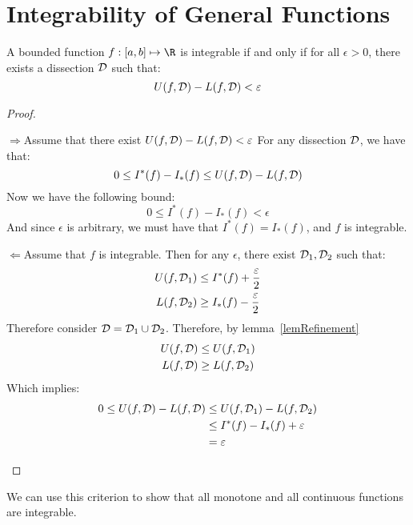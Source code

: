 \documentclass[../Main.tex]{subfiles}
\begin{document}
\section{Integrability of General Functions}
\begin{theorem}
    A bounded function $f : [a, b] \mapsto \R$ is integrable if and only if for all $\epsilon > 0$, there exists a dissection $\mathcal{D}$ such that:
    \begin{equation*}
        U(f, \mathcal{D}) - L(f, \mathcal{D}) < \varepsilon
    \end{equation*}
    \label{thmRiemannCriterion}
\end{theorem}
\begin{proof}
    \begin{proofdirection}{$\Rightarrow$}{Assume that there exist $U(f, \mathcal{D}) - L(f, \mathcal{D}) < \varepsilon$}
        For any dissection $\mathcal{D}$, we have that:
        \begin{equation*}
            0 \leq I^*(f) - I_*(f) \leq U(f, \mathcal{D}) - L(f, \mathcal{D})
        \end{equation*}
        Now we have the following bound:
        \begin{equation*}
            0 \leq I^*(f) - I_*(f) < \epsilon
        \end{equation*}
        And since $\epsilon$ is arbitrary, we must have that $I^*(f) = I_*(f)$, and $f$ is integrable.
    \end{proofdirection}
    \begin{proofdirection}{$\Leftarrow$}{Assume that $f$ is integrable.}
        Then for any $\epsilon$, there exist $\mathcal{D}_1, \mathcal{D}_2$ such that:
        \begin{align*}
            U(f, \mathcal{D}_1) &\leq I^*(f) + \frac{\varepsilon}{2} \\
            L(f, \mathcal{D}_2) &\geq I_*(f) - \frac{\varepsilon}{2}
        \end{align*}
        Therefore consider $\mathcal{D} = \mathcal{D}_1 \cup \mathcal{D}_2$. Therefore, by lemma~\ref{lemRefinement}
        \begin{align*}
            U(f, \mathcal{D}) &\leq U(f, \mathcal{D}_1) \\
            L(f, \mathcal{D}) &\geq L(f, \mathcal{D}_2)
        \end{align*}
        Which implies:
        \begin{align*}
            0 \leq U(f, \mathcal{D}) - L(f, \mathcal{D}) &\leq U(f, \mathcal{D}_1) - L(f, \mathcal{D}_2) \\
            &\leq I^*(f) - I_*(f) + \varepsilon \\
            &= \varepsilon
        \end{align*}
    \end{proofdirection}
\end{proof}
We can use this criterion to show that all monotone and all continuous functions are integrable.
\end{document}
